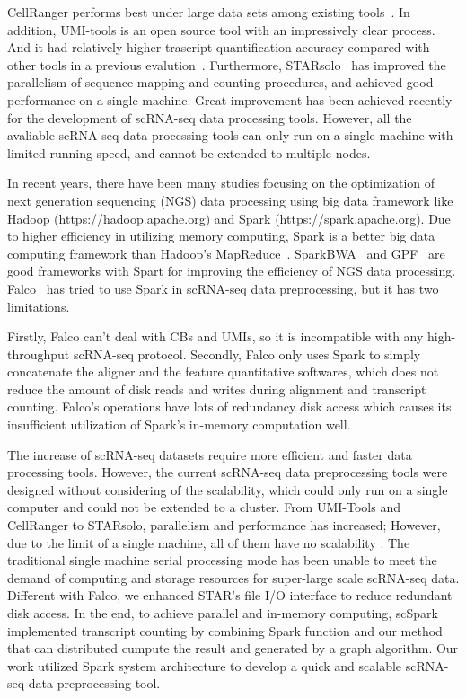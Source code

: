 \documentclass[conference]{IEEEtran}
\begin{document}
CellRanger performs best under large data sets among existing tools~\cite{Gao2020Comparison}.
In addition, UMI-tools is an open source tool with an impressively clear process. And it had relatively higher trascript quantification accuracy compared with other tools in a previous evalution~\cite{Gao2020Comparison}. 
Furthermore, STARsolo~\cite{Blibaum2019STARsolo} has improved the parallelism of sequence mapping and counting procedures, and achieved good performance on a single machine.
Great improvement has been achieved recently for the development of scRNA-seq data processing tools. However, all the avaliable scRNA-seq data processing tools can only run on a single machine with limited running speed, and cannot be extended to multiple nodes.

In recent years, there have been many studies focusing on the optimization of next generation sequencing (NGS) data processing using big data framework like Hadoop (\url{https://hadoop.apache.org}) and Spark (\url{https://spark.apache.org}). 
Due to higher efficiency in utilizing memory computing, Spark is a better big data computing framework than Hadoop's MapReduce~\cite{Dean2008MapReduce, zaharia2010spark, Zaharia2012Resilient}. 
SparkBWA~\cite{Abun2016SparkBWA} and GPF~\cite{Li2018Highperformance} are good frameworks with Spart for improving the efficiency of NGS data processing. 
Falco~\cite{Yang2017Falco} has tried to use Spark in scRNA-seq data preprocessing, but it has two limitations. 

Firstly, Falco can't deal with CBs and UMIs, so it is incompatible with any high-throughput scRNA-seq protocol.
Secondly, Falco only uses Spark to simply concatenate the aligner and the feature quantitative softwares, which does not reduce the amount of disk reads and writes during alignment and transcript counting.
Falco’s operations have lots of redundancy disk access which causes its insufficient utilization of Spark’s in-memory computation well. 

The increase of scRNA-seq datasets require more efficient and faster data processing tools.
However, the current scRNA-seq data preprocessing tools were designed without considering of the scalability, which could only run on a single computer and could not be extended to a cluster. From UMI-Tools and CellRanger to STARsolo, parallelism and performance has increased; However, due to the limit of a single machine, all of them have no scalability . 
The traditional single machine serial processing mode has been unable to meet the demand of computing and storage resources for super-large scale scRNA-seq data.
Different with Falco, we enhanced STAR's file I/O interface to reduce redundant disk access.
In the end, to achieve parallel and in-memory computing, scSpark implemented transcript counting by combining Spark function and our method that can distributed cumpute the result and generated by a graph algorithm.
Our work utilized Spark system architecture to develop a quick and scalable scRNA-seq data preprocessing tool. 
\end{document}
